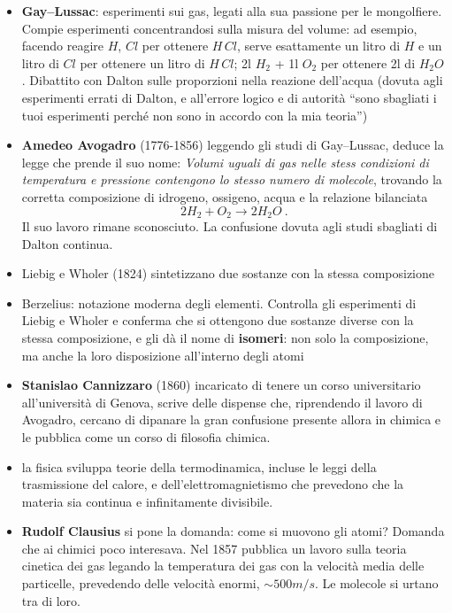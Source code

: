 \begin{itemize}
    \item \textbf{Gay--Lussac}: esperimenti sui gas, legati alla sua passione per le mongolfiere. Compie esperimenti concentrandosi sulla misura del volume: ad esempio, facendo reagire $H$, $Cl$ per ottenere $H \, Cl$, serve esattamente un litro di $H$ e un litro di $Cl$ per ottenere un litro di $H \, Cl$; 2l $H_2$ + 1l $O_2$ per ottenere 2l di $H_2 O$.
        Dibattito con Dalton sulle proporzioni nella reazione dell'acqua (dovuta agli esperimenti errati di Dalton, e all'errore logico e di autorità ``sono sbagliati i tuoi esperimenti perché non sono in accordo con la mia teoria'')
    \item \textbf{Amedeo Avogadro} (1776-1856) leggendo gli studi di Gay--Lussac, deduce la legge che prende il suo nome: \textit{Volumi uguali di gas nelle stess condizioni di temperatura e pressione contengono lo stesso numero di molecole},
       trovando la corretta composizione di idrogeno, ossigeno, acqua e la relazione bilanciata
        \begin{equation}
            2 H_2 + O_2 \rightarrow 2 H_2 O \ .
        \end{equation}
       Il suo lavoro rimane sconosciuto. La confusione dovuta agli studi sbagliati di Dalton continua.
    \item Liebig e Wholer (1824) sintetizzano due sostanze con la stessa composizione
    \item Berzelius: notazione moderna degli elementi. Controlla gli esperimenti di Liebig e Wholer e conferma che si ottengono due sostanze diverse con la stessa composizione, e gli dà il nome di \textbf{isomeri}: non solo la composizione, ma anche la loro disposizione all'interno degli atomi
    \item \textbf{Stanislao Cannizzaro} (1860) incaricato di tenere un corso universitario all'università di Genova, scrive delle dispense che, riprendendo il lavoro di Avogadro, cercano di dipanare la gran confusione presente allora in chimica e le pubblica come un corso di filosofia chimica.
    \item la fisica sviluppa teorie della termodinamica, incluse le leggi della trasmissione del calore, e dell'elettromagnietismo che prevedono che la materia sia continua e infinitamente divisibile.
    \item \textbf{Rudolf Clausius} si pone la domanda: come si muovono gli atomi? Domanda che ai chimici poco interesava. Nel 1857 pubblica un lavoro sulla teoria cinetica dei gas legando la temperatura dei gas con la velocità media delle particelle, prevedendo delle velocità enormi, $\sim 500 m/s$. Le molecole si urtano tra di loro.

\end{itemize}
